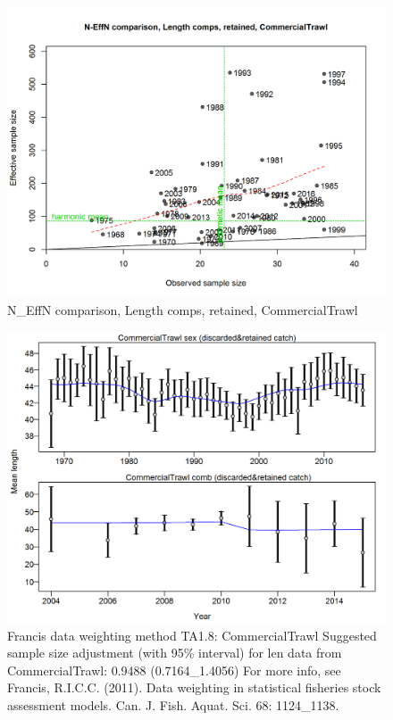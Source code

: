\documentclass[12pt,]{article}
\begin{document}
\begin{figure}[htbp]
\centering
\includegraphics{./r4ss/plots_mod1/comp_lenfit_sampsize_flt1mkt2.png}
\caption{N\_EffN comparison, Length comps, retained, CommercialTrawl
\label{fig:mod1_4_comp_lenfit_sampsize_flt1mkt2}}
\end{figure}

\begin{figure}[htbp]
\centering
\includegraphics{./r4ss/plots_mod1/comp_lenfit_data_weighting_TA1.8_CommercialTrawl.png}
\caption{Francis data weighting method TA1.8: CommercialTrawl Suggested
sample size adjustment (with 95\% interval) for len data from
CommercialTrawl: 0.9488 (0.7164\_1.4056) For more info, see Francis,
R.I.C.C. (2011). Data weighting in statistical fisheries stock
assessment models. Can. J. Fish. Aquat. Sci. 68: 1124\_1138.
\label{fig:mod1_5_comp_lenfit_data_weighting_TA1.8_CommercialTrawl}}
\end{figure}
\end{document}
